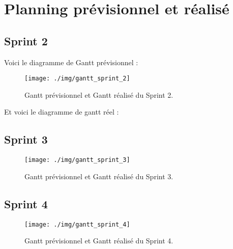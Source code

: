 \newpage


\section{Planning prévisionnel et réalisé} %
\subsection{Sprint 2}
Voici le diagramme de Gantt prévisionnel : 

\begin{figure}[H]
  \centering
  \texttt{[image: ./img/gantt\_sprint\_2]}
  \caption{\label{fig:mb_va_ast} Gantt prévisionnel et Gantt réalisé du Sprint 2.}
\end{figure}

Et voici le diagramme de gantt réel : 



\subsection{Sprint 3}
\begin{figure}[H]
  \centering
  \texttt{[image: ./img/gantt\_sprint\_3]}
  \caption{\label{fig:mb_va_ast} Gantt prévisionnel et Gantt réalisé du Sprint 3.}
\end{figure}

\subsection{Sprint 4}

\begin{figure}[H]
  \centering
  \texttt{[image: ./img/gantt\_sprint\_4]}
  \caption{\label{fig:mb_va_ast} Gantt prévisionnel et Gantt réalisé du Sprint 4.}
\end{figure}



